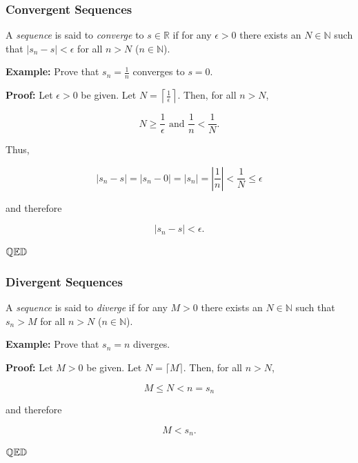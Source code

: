 \documentclass[10pt]{beamer}
\def\R{\mathbb{R}}                     %
\def\N{\mathbb{N}}                     %
\def\Q{\mathbb{Q}}                     %
\def\D{\mathbb{D}}                     %
\def\qed{ \hspace*{\fill} \Q \mathbb{E} \D}
\begin{document}
\begin{frame}
  \frametitle{Convergent Sequences}

  A \textit{sequence} is said to \textit{converge} to $s \in \R$ if for any $\epsilon > 0$ there exists an $N \in \N$ such that $\vert s_n - s \vert < \epsilon$ for all $n > N$ ($n \in \N$). \pause
  \vspace{5mm}

  \textbf{Example:} Prove that $s_n = \frac{1}{n}$ converges to $s = 0$. \pause
  \vspace{5mm}

  \textbf{Proof:} Let $\epsilon > 0$ be given. \pause Let $N = \left \lceil \frac{1}{\epsilon} \right \rceil$. Then, for all $n > N$, \pause

  \[ N \ge \frac{1}{\epsilon} \text{ and } \frac{1}{n} < \frac{1}{N}. \] \pause

  Thus,

  \[ \left \vert s_n - s \right \vert = \left \vert s_n - 0 \right \vert =  \left \vert s_n \right \vert =
  \left \vert \frac{1}{n} \right \vert < \frac{1}{N} \le \epsilon \] \pause

  and therefore

  \[ \left \vert s_n - s \right \vert < \epsilon. \] \pause

  $\qed$

\end{frame}


\begin{frame}
  \frametitle{Divergent Sequences}

  A \textit{sequence} is said to \textit{diverge} if for any $M > 0$ there exists an $N \in \N$ such that $s_n > M$ for all $n > N$ ($n \in \N$). \pause
  \vspace{5mm}

  \textbf{Example:} Prove that $s_n = n$ diverges. \pause
  \vspace{5mm}

  \textbf{Proof:} Let $M>0$ be given. \pause Let $N = \lceil M \rceil$. \pause Then, for all $n > N$,

  \[ M \le N < n = s_n \] \pause

  and therefore

  \[ M < s_n. \] \pause

  $\qed$

\end{frame}
\end{document}
